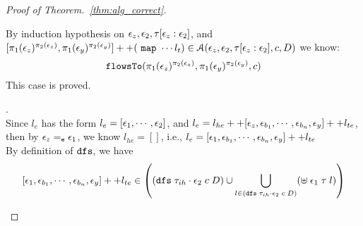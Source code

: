 \begin{proof}[Proof of Theorem.~\ref{thm:alg_correct}]
\begin{case}
\begin{subcase}
\[\]
%
%
By induction hypothesis on $\mathtt{\epsilon}_z, \mathtt{\epsilon}_2, \mathtt{\tau}[\mathtt{\epsilon}_z: \mathtt{\epsilon}_2]$,
 and 
 \\
 $[\pi_1(\mathtt{\epsilon}_z)^{\pi_2(\mathtt{\epsilon}_z)}, \pi_1(\mathtt{\epsilon}_y)^{\pi_2(\mathtt{\epsilon}_y)}] ++ (~\mathtt{map}~ \cdots l_t )
 \in\mathcal{A}(\mathtt{\epsilon}_z, \mathtt{\epsilon}_2, \mathtt{\tau}[\mathtt{\epsilon}_z: \mathtt{\epsilon}_2], c, D)$ we know:
\[
  \mathtt{flowsTo}(\pi_1(\mathtt{\epsilon}_z)^{\pi_2(\mathtt{\epsilon}_z)}, \pi_1(\mathtt{\epsilon}_y)^{\pi_2(\mathtt{\epsilon}_y)}, c)
\]
This case is proved.
%
\end{subcase}
\begin{subcase}.
  \label{case:asn_ind}
\\
Since $l_e$ has the form $l_e = [\mathtt{\epsilon}_1, \cdots, \mathtt{\epsilon}_2] $, 
and $l_e = l_{he} ++ [\mathtt{\epsilon}_z, \mathtt{\epsilon}_{b_1}, \cdots, \mathtt{\epsilon}_{b_n}, \mathtt{\epsilon}_y] ++ l_{te}$, 
then by $\mathtt{\epsilon}_z =_{\mathtt{e}} \mathtt{\epsilon}_1$, we know $l_{he} = []$, i.e., $l_e = [\mathtt{\epsilon}_1, \mathtt{\epsilon}_{b_1}, \cdots, \mathtt{\epsilon}_{b_n}, \mathtt{\epsilon}_y] ++ l_{te}$
\\
By definition of $\mathtt{dfs}$, we have
%
\[
  [\event_1, \event_{b_1}, \cdots, \event_{b_n}, \event_y] ++ l_{te}  \in 
  \left(  (\kw{dfs} \eapp {\trace_{ih} \cdot \event_2} \eapp c \eapp D ) \cup
  \bigcup\limits_{l \in (\kw{dfs} \eapp {\trace_{ih} \cdot \event_2} \eapp c \eapp D) }(\uplus \eapp \event_1 \eapp \trace \eapp l)
  \right)
\]

\end{subcase}
\end{case}
\end{proof}
